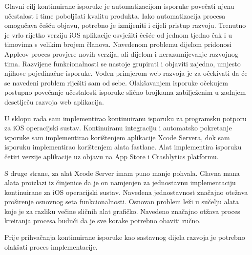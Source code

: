 \documentclass[times, utf8, diplomski, numeric]{fer}
\begin{document}
Glavni cilj kontinuirane isporuke je automatizacijom isporuke povečati njenu učestalost i time poboljšati kvalitu produkta. Iako automatizacija procesa omogučava češću objavu, potrebno je izmijeniti i cijeli pristup razvoju. Trenutno je vrlo rijetko verziju iOS aplikacije osvježiti češće od jednom tjedno čak i u timovima s velikim brojem članova. Navedenom problemu dijelom pridonosi Appleov proces provjere novih verzija, ali dijelom i nerazumijevanje razvojnog tima. Razvijene funkcionalnosti se nastoje grupirati i objaviti zajedno, umjesto njihove pojedinačne isporuke. Vođen primjerom web razvoja je za očekivati da će se navedeni problem riješiti sam od sebe. Olakšavanjem isporuke očekujem postupno povečanje učestalosti isporuke slično brojkama zabilježenim u zadnjem desetlječu razvoja web aplikacija.

U sklopu rada sam implementirao kontinuiranu isporuku za programsku potporu za iOS operacijski sustav. Kontinuiranu integraciju i automatsko pokretanje isporuke sam implementirao korištenjem aplikacije Xcode Servera, dok sam isporuku implementirao korištenjem alata fastlane. Alat implementira isporuku četiri verzije aplikacije uz objavu na App Store i Crashlytics platformu.

S druge strane, za alat Xcode Server imam puno manje pohvala. Glavna mana alata proizlazi iz činjenice da je on namjenjen za jednostavnu implementaciju kontinuirane za iOS operacijski sustav. Navedena jednostavnost značajno otežava proširenje osnovnog seta funkcionalnosti. Osnovan problem leži u sučelju alata koje je za razliku večine sličnih alat grafičko. Navedeno značajno otžava proces kreiranja procesa buduči da je sve korake potrebno obaviti ručno.

Prije prihvačanja kontinuirane isporuke kao sastavnog dijela razvoja je potrebno olakšati proces implementacije.






\end{document}
